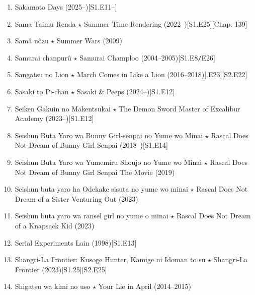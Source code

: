 \documentclass{article}
\begin{document}
\begin{enumerate}
    \item Sakamoto Days (2025--)\hfill[S1.E11--]
    \item {\sc Sama Taimu Renda $\star$ Summer Time Rendering} (2022--)\hfill[S1.E25][Chap. 139]
    \item {\sc Samâ uôzu $\star$ Summer Wars} (2009)
    \item Samurai chanpurû $\star$ Samurai Champloo (2004--2005)\hfill[S1.E8{\tt/}E26]
    \item {\sc Sangatsu no Lion $\star$ March Comes in Like a Lion} (2016--2018)\hfill[.E23][S2.E22]
    \item {\sc Sasaki to Pi-chan $\star$ Sasaki \& Peeps} (2024--)\hfill[S1.E12]
    \item {\sc Seiken Gakuin no Makentsukai $\star$ The Demon Sword Master of Excalibur Academy} (2023--)\hfill[S1.E12]
    \item {\sc Seishun Buta Yaro wa Bunny Girl-senpai no Yume wo Minai $\star$ Rascal Does Not Dream of Bunny Girl Senpai} (2018--)\hfill[S1.E14]
    \item {\sc Seishun Buta Yaro wa Yumemiru Shoujo no Yume wo Minai $\star$ Rascal Does Not Dream of Bunny Girl Senpai The Movie} (2019)
    \item {\sc Seishun buta yaro ha Odekake sisuta no yume wo minai $\star$ Rascal Does Not Dream of a Sister Venturing Out} (2023)
    \item {\sc Seishun buta yaro wa ransel girl no yume o minai $\star$ Rascal Does Not Dream of a Knapsack Kid} (2023)
    \item {\sc Serial Experiments Lain} (1998)\hfill[S1.E13]
    \item {\sc Shangri-La Frontier: Kusoge Hunter, Kamige ni Idoman to su $\star$ Shangri-La Frontier} (2023)\hfill[S1.25][S2.E25]
    \item {\sc Shigatsu wa kimi no uso $\star$ Your Lie in April} (2014--2015)
    

\end{enumerate}
\end{document}
